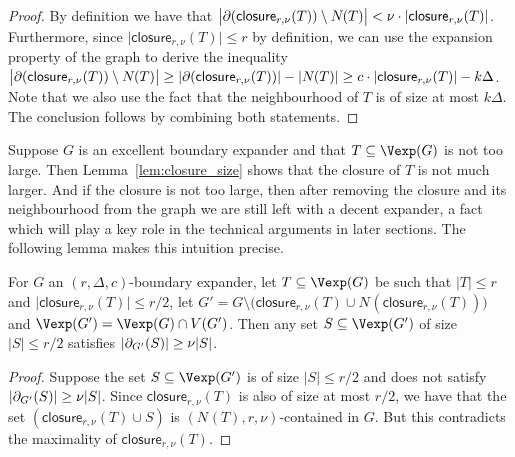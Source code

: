 \documentclass{article}
\providecommand{\abs}[1]{\lvert#1\rvert}
\newcommand{\boundary}[1]{\ensuremath{\partial #1}}
\newcommand{\Setsize}[1]{\bigl\lvert#1\bigr\rvert}
\newcommand{\setsize}[1]{\lvert#1\rvert}
\newcommand{\reflem}[1]{Lemma~\ref{#1}}
\newcommand{\neigh}[2][]{N_{{#1}}(#2)}
\newcommand{\uniqueNeigh}[2][]{\boundary_{{#1}} ({#2})}
\newcommand{\GdegMax}{\Delta}
\newcommand{\gdegmax}{\GdegMax}
\newcommand{\contained}[3]{$(#1, #2, #3)$-contained}
\newcommand{\closure}[2][]{\mathsf{closure}_{{#1}}(#2)}
\newcommand{\expansionconst}{c}
\newcommand{\almostcontained}{\nu}
\newcommand{\setsizemax}{k}
\numberwithin{equation}{section}
\begin{document}
\begin{proof}
  By definition we have that 
  $ \Setsize{ 
  \uniqueNeigh{\closure[r, \almostcontained]{T}}  \setminus \neigh{T} } < 
  \nu \cdot \setsize{\closure[r, \almostcontained]{T}}$.
  Furthermore, since 
  $\setsize{\closure[r, \almostcontained]{T}} \leq r$ by definition,
  we can use the expansion property of the graph to derive 
  the inequality
  $\Setsize{
    \uniqueNeigh{\closure[r, \almostcontained]{T}} \setminus \neigh{T}
  } 
  \ge \setsize{\uniqueNeigh{\closure[r, \almostcontained]{T}}} - \setsize{ \neigh{T} }
  \ge  
  \expansionconst \cdot \setsize{\closure[r, \almostcontained]{T}} - 
  \setsizemax  \GdegMax 
  $. Note that we also use the fact that the neighbourhood of $T$ is of size at most 
  $\setsizemax \GdegMax$. 
  The conclusion follows by combining both statements.
\end{proof}

  Suppose $G$ is an excellent boundary expander and that $T \subseteq \Vexp(G)$
  is not too large. Then \reflem{lem:closure_size} shows that the
  closure of $T$ is not much larger.  
  And if the closure is not too large, then
  after removing the closure and its neighbourhood from the graph
  we are still left with a decent expander,
  a fact which will play a key role in the technical arguments in later
  sections. The following lemma makes this intuition precise.


\begin{lemma}\label{lem:closure_expansion}
  For $G$ an 
  $(r, \gdegmax, \expansionconst )$-boundary expander,
  let $T \subseteq \Vexp(G)$ be such that $\setsize{T} \le r$ and
  $\setsize{ \closure[r, \almostcontained]{T} } \le r/2$,
  let $G' = G \setminus \bigl( \closure[r, \almostcontained]{T} \cup 
  \neigh{\closure[r, \almostcontained]{T}} \bigr)$ and
  $\Vexp(G') = \Vexp(G) \cap V(G')$.
  Then any set $S \subseteq \Vexp(G')$ of size $\setsize{S} \le r/2$
  satisfies
$    \abs{ \uniqueNeigh[G']{S}} \ge 
    \almostcontained \setsize{S} $. \end{lemma}

\begin{proof}
  Suppose the set $S \subseteq \Vexp(G')$ is of size $\setsize{S} \le r/2$ and 
  does not satisfy $    \abs{ \uniqueNeigh[G']{S}} \ge 
    \almostcontained \setsize{S} $.
  Since
  $\closure[r, \almostcontained]{T}$ is also of size at most
  $r/2$, we have that
the set
  $(\closure[r, \almostcontained]{T} \cup S)$ is 
  \contained{\neigh{T}}{r}{\almostcontained} in $G$.
  But this contradicts the maximality of $\closure[r, \almostcontained]{T}$.
\end{proof}
\end{document}

